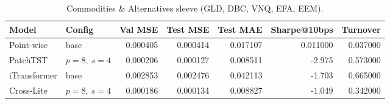 \begin{table}
\caption{Commodities \& Alternatives sleeve (GLD, DBC, VNQ, EFA, EEM).}
\label{tab:commod_alt_h1}
\begin{tabular}{l l r r r r r}
\toprule
Model & Config & Val MSE & Test MSE & Test MAE & Sharpe@10bps & Turnover \\
\midrule
Point-wise & base & 0.000405 & 0.000414 & 0.017107 & 0.011000 & 0.037000 \\
PatchTST & $p=8,\ s=4$ & 0.000206 & 0.000127 & 0.008511 & -2.975 & 0.573000 \\
iTransformer & base & 0.002853 & 0.002476 & 0.042113 & -1.703 & 0.665000 \\
Cross-Lite & $p=8,\ s=4$ & 0.000186 & 0.000134 & 0.008827 & -1.049 & 0.342000 \\
\bottomrule
\end{tabular}
\end{table}
